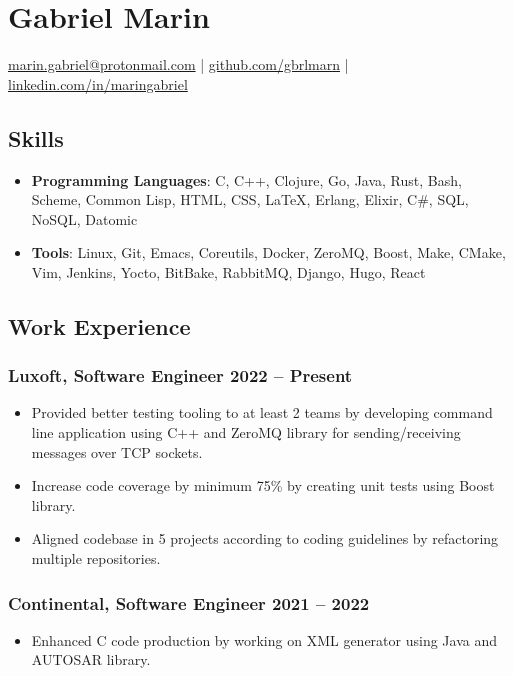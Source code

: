 \documentclass[a4paper,12pt]{article}
\date{}
\title{}
\begin{document}
\section*{\textbf{Gabriel Marin}}
\label{sec:org4ffd019}
\begin{center}
\href{mailto:marin.gabriel@protonmail.com}{marin.gabriel@protonmail.com} |
\href{https://github.com/gbrlmarn}{github.com/gbrlmarn} |
\href{https://linkedin.com/in/maringabriel}{linkedin.com/in/maringabriel}
\end{center}
\subsection*{\textbf{Skills}}
\label{sec:orge8c1c44}
\begin{itemize}
\item \textbf{Programming Languages}: C, C++, Clojure, Go, Java, Rust, Bash,
Scheme, Common Lisp, HTML, CSS, \LaTeX{}, Erlang, Elixir, C\#, SQL, NoSQL, Datomic
\item \textbf{Tools}: Linux, Git, Emacs, Coreutils, Docker, ZeroMQ, Boost,
Make, CMake, Vim, Jenkins, Yocto, BitBake, RabbitMQ, Django, Hugo, React
\end{itemize}
\subsection*{\textbf{Work Experience}}
\label{sec:orgc76315c}
\subsubsection*{\textbf{Luxoft}, Software Engineer \hfill 2022 -- Present}
\label{sec:org681c820}
\begin{itemize}
\item Provided better testing tooling to at least 2 teams by developing command line
application using C++ and ZeroMQ library for sending/receiving messages over TCP sockets.
\item Increase code coverage by minimum 75\% by creating unit tests using Boost library.
\item Aligned codebase in 5 projects according to coding guidelines
by refactoring multiple repositories.
\end{itemize}
\subsubsection*{\textbf{Continental}, Software Engineer \hfill 2021 -- 2022}
\label{sec:orgb765d08}
\begin{itemize}
\item Enhanced C code production by working on XML generator using Java and AUTOSAR library.
\end{itemize}
\end{document}
